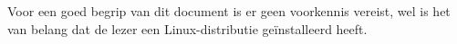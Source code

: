 Voor een goed begrip van dit document is er geen voorkennis vereist, wel is het van belang dat de lezer een Linux-distributie ge\"installeerd heeft.
